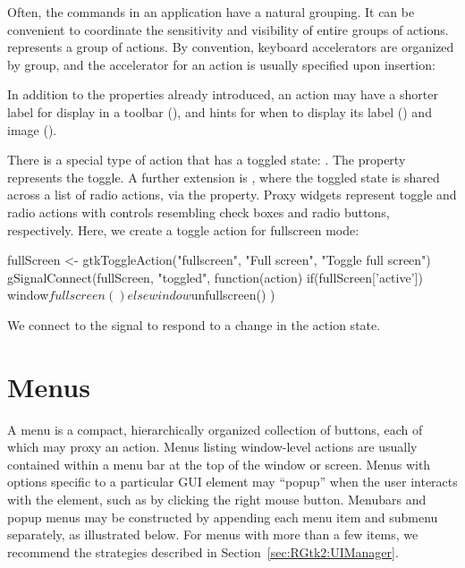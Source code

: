Often, the commands in an application have a natural grouping. It can
be convenient to coordinate the sensitivity and visibility of entire
groups of actions.  represents a group of
actions. By convention, keyboard accelerators are organized by group,
and the accelerator for an action is usually specified upon insertion:
\begin{Schunk}
\end{Schunk}

In addition to the properties already introduced, an action may have a
shorter label for display in a toolbar (), and
hints for when to display its label () and image
().

There is a special type of action that has a toggled state:
. The  property represents the
toggle. A further extension is , where the
toggled state is shared across a list of radio actions, via the
 property. Proxy widgets represent toggle and radio
actions with controls resembling check boxes and radio buttons,
respectively. Here, we create a toggle action for fullscreen mode:
\begin{Schunk}
\begin{Sinput}
 fullScreen <- gtkToggleAction("fullscreen", "Full screen", 
                               "Toggle full screen")
 gSignalConnect(fullScreen, "toggled", function(action) {
   if(fullScreen['active'])
     window$fullscreen()
   else
     window$unfullscreen()
 })
\end{Sinput}
\end{Schunk}
%
We connect to the  signal to respond to a change in the
action state.


\section{Menus}
\label{sec:RGtk2:menus}

A menu is a compact, hierarchically organized collection of buttons,
each of which may proxy an action. Menus listing window-level actions
are usually contained within a menu bar at the top of the window or
screen. Menus with options specific to a particular GUI element may
``popup'' when the user interacts with the element, such as by
clicking the right mouse button. Menubars and popup menus may be
constructed by appending each menu item and submenu separately, as
illustrated below. For menus with more than a few items, we recommend
the strategies described in Section~\ref{sec:RGtk2:UIManager}.

